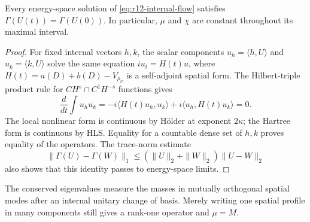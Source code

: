 \begin{lemma}
\label{lem:r12-Gamma-conservation}
Every energy-space solution of \eqref{eq:r12-internal-flow} satisfies
$\Gamma(U(t))=\Gamma(U(0))$. In particular, $\mu$ and $\chi$ are
constant throughout its maximal interval.
\end{lemma}
\begin{proof}
For fixed internal vectors $h,k$, the scalar components
$u_h=\langle h,U\rangle$ and $u_k=\langle k,U\rangle$ solve the
same equation $iu_t=H(t)u$, where
$H(t)=a(D)+b(D)-V_{\rho_U}$ is a self-adjoint spatial form.
The Hilbert-triple product rule for
$C H^s\cap C^1 H^{-s}$ functions gives
\[
 \frac{d}{dt}\int u_h\overline{u_k}
 =-i\langle H(t)u_h,u_k\rangle
       +i\langle u_h,H(t)u_k\rangle=0.
\]
The local nonlinear form is continuous by H\"older at exponent
$2\kappa$; the Hartree form is continuous by HLS. Equality for a
countable dense set of $h,k$ proves equality of the operators.
The trace-norm estimate
\[
 \|\Gamma(U)-\Gamma(W)\|_1
 \le(\|U\|_2+\|W\|_2)\|U-W\|_2
\]
also shows that this identity passes to energy-space limits.
\end{proof}

The conserved eigenvalues measure the masses in mutually orthogonal
spatial modes after an internal unitary change of basis. Merely writing
one spatial profile in many components still gives a rank-one operator
and $\mu=M$.

